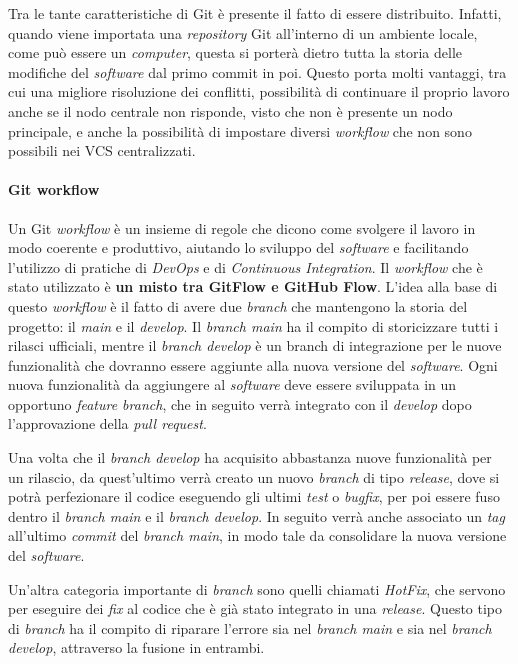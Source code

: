 Tra le tante caratteristiche di Git è presente il fatto di essere distribuito. Infatti, quando viene importata una \textit{repository} Git all'interno di un ambiente locale, come può essere un \textit{computer}, questa si porterà dietro tutta la storia delle modifiche del \textit{software} dal primo commit in poi. Questo porta molti vantaggi, tra cui una migliore risoluzione dei conflitti, possibilità di continuare il proprio lavoro anche se il nodo centrale non risponde, visto che non è presente un nodo principale, e anche la possibilità di impostare diversi \textit{workflow} che non sono possibili nei VCS centralizzati. 

\paragraph{Git workflow}
Un Git \textit{workflow} è un insieme di regole che dicono come svolgere il lavoro in modo coerente e produttivo,  aiutando lo sviluppo del \textit{software} e facilitando l'utilizzo di pratiche di \textit{DevOps} e di \textit{Continuous Integration}. Il \textit{workflow} che è stato utilizzato è \textbf{un misto tra GitFlow e GitHub Flow}.
L'idea alla base di questo \textit{workflow} è il fatto di avere due \textit{branch} che mantengono la storia del progetto: il \textit{main} e il \textit{develop}. Il \textit{branch main} ha il compito di storicizzare tutti i rilasci ufficiali, mentre il \textit{branch develop} è un branch di integrazione per le nuove funzionalità che dovranno essere aggiunte alla nuova versione del \textit{software}. Ogni nuova funzionalità da aggiungere al \textit{software} deve essere sviluppata in un opportuno \textit{feature branch}, che in seguito verrà integrato con il \textit{develop} dopo l'approvazione della \textit{pull request}.

Una volta che il \textit{branch develop} ha acquisito abbastanza nuove funzionalità per un rilascio, da quest'ultimo verrà creato un nuovo \textit{branch} di tipo \textit{release}, dove si potrà perfezionare il codice eseguendo gli ultimi \textit{test} o \textit{bugfix}, per poi essere fuso dentro il \textit{branch main} e il \textit{branch develop}. In seguito verrà anche associato un \textit{tag} all'ultimo \textit{commit} del \textit{branch main}, in modo tale da consolidare la nuova versione del \textit{software}.

Un'altra categoria importante di \textit{branch} sono quelli chiamati \textit{HotFix}, che servono per eseguire dei \textit{fix} al codice che è già stato integrato in una \textit{release}. Questo tipo di \textit{branch} ha il compito di riparare l'errore sia nel \textit{branch main} e sia nel \textit{branch develop}, attraverso la fusione in entrambi. \\

